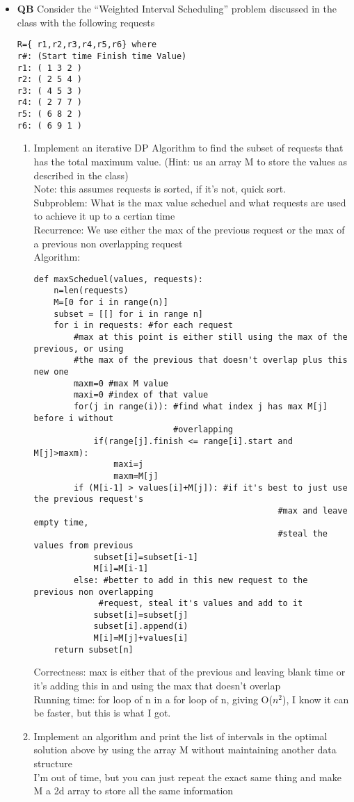 \documentclass[11pt]{article}
\begin{document}
\begin{itemize}
\item \textbf{QB} 
Consider the “Weighted Interval Scheduling” problem discussed in the class with the following requests
\begin{verbatim}
R={ r1,r2,r3,r4,r5,r6} where
r#: (Start time Finish time Value)
r1: ( 1 3 2 ) 
r2: ( 2 5 4 ) 
r3: ( 4 5 3 ) 
r4: ( 2 7 7 ) 
r5: ( 6 8 2 ) 
r6: ( 6 9 1 )
\end{verbatim}
\begin{enumerate}
\item Implement an iterative DP Algorithm to find the subset of requests that has the total maximum value. (Hint: us an array M to store the values as described in the class)
\\Note: this assumes requests is sorted, if it's not, quick sort.
\\Subproblem: What is the max value scheduel and what requests are used to achieve it up to a certian time
\\Recurrence: We use either the max of the previous request or the max of a previous non overlapping request
\\Algorithm:
\begin{verbatim}
def maxScheduel(values, requests):
    n=len(requests)
    M=[0 for i in range(n)]
    subset = [[] for i in range n]
    for i in requests: #for each request
        #max at this point is either still using the max of the previous, or using 
        #the max of the previous that doesn't overlap plus this new one
        maxm=0 #max M value
        maxi=0 #index of that value
        for(j in range(i)): #find what index j has max M[j] before i without 
                            #overlapping
            if(range[j].finish <= range[i].start and M[j]>maxm):
                maxi=j
                maxm=M[j]
        if (M[i-1] > values[i]+M[j]): #if it's best to just use the previous request's 
                                                 #max and leave empty time, 
                                                 #steal the values from previous
            subset[i]=subset[i-1]
            M[i]=M[i-1]
        else: #better to add in this new request to the previous non overlapping 
             #request, steal it's values and add to it
            subset[i]=subset[j]
            subset[i].append(i)
            M[i]=M[j]+values[i]
    return subset[n]
\end{verbatim}
Correctness: max is either that of the previous and leaving blank time or it's adding this in and using the max that doesn't overlap
\\Running time: for loop of n in a for loop of n, giving O($n^2$), I know it can be faster, but this is what I got.
\item Implement an algorithm and print the list of intervals in the optimal solution above by using the array M without maintaining another data structure
\\I'm out of time, but you can just repeat the exact same thing and make M a 2d array to store all the same information
\end{enumerate}

\end{itemize}
\end{document}
